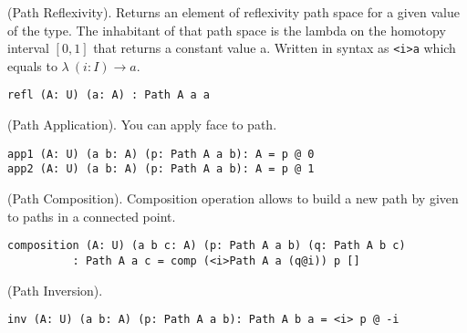 \begin{definition} (Path Reflexivity).
Returns an element of reflexivity path space for a given value of the type.
The inhabitant of that path space is the lambda on the homotopy
interval $[0,1]$ that returns a constant value a. Written in
syntax as \lstinline{<i>a} which equals to $\lambda\ (i: I) \rightarrow a$.
\begin{lstlisting}
refl (A: U) (a: A) : Path A a a
\end{lstlisting}
\end{definition}

\begin{definition} (Path Application).
You can apply face to path.
\begin{lstlisting}
app1 (A: U) (a b: A) (p: Path A a b): A = p @ 0
app2 (A: U) (a b: A) (p: Path A a b): A = p @ 1
\end{lstlisting}
\end{definition}

\begin{definition} (Path Composition).
Composition operation allows to build a new path by given to paths
in a connected point.
\begin{center}
\end{center}
\begin{lstlisting}
composition (A: U) (a b c: A) (p: Path A a b) (q: Path A b c)
          : Path A a c = comp (<i>Path A a (q@i)) p []
\end{lstlisting}
\end{definition}

\begin{theorem} (Path Inversion).
\begin{lstlisting}
inv (A: U) (a b: A) (p: Path A a b): Path A b a = <i> p @ -i
\end{lstlisting}
\end{theorem}

